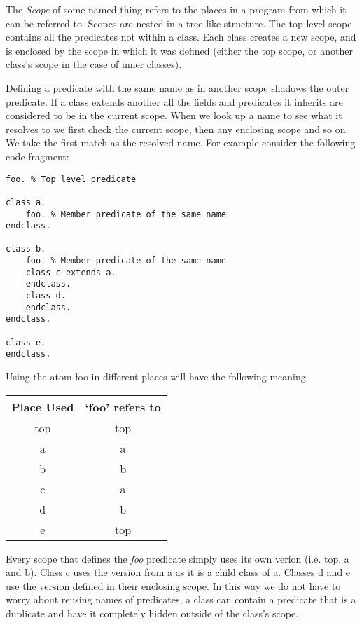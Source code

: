 \documentclass[12pt,a4paper,twoside,openright]{report}
\begin{document}
The \emph{Scope} of some named thing refers to the places in a program from which it can be referred to. Scopes are nested in a tree-like structure. The top-level scope contains all the predicates not within a class. Each class creates a new scope, and is enclosed by the scope in which it was defined (either the top scope, or another class's scope in the case of inner classes).

\bigskip

Defining a predicate with the same name as in another scope shadows the outer predicate. If a class extends another all the fields and predicates it inherits are considered to be in the current scope. When we look up a name to see what it resolves to we first check the current scope, then any enclosing scope and so on. We take the first match as the resolved name. For example consider the following code fragment:

\begin{lstlisting}
foo. % Top level predicate

class a.
	foo. % Member predicate of the same name
endclass.

class b.
	foo. % Member predicate of the same name
	class c extends a.
	endclass.
	class d.
	endclass.
endclass.

class e.
endclass.

\end{lstlisting}


\noindent Using the atom foo in different places will have the following meaning

\begin{center}
\begin{tabular}{c|c}
Place Used & `foo' refers to \\
\hline
top & top \\
a & a \\
b & b \\
c & a \\
d & b \\
e & top \\
\end{tabular}
\end{center}

Every scope that defines the \emph{foo} predicate simply uses its own verion (i.e. top, a and b). Class c uses the version from a as it is a child class of a. Classes d and e use the version defined in their enclosing scope. In this way we do not have to worry about reusing names of predicates, a class can contain a predicate that is a duplicate and have it completely hidden outside of the class's scope.
\end{document}
